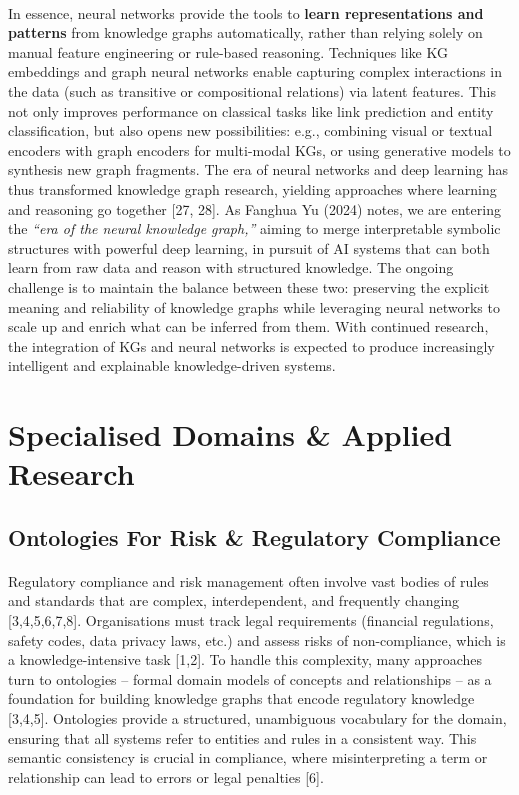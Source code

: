         \paragraph{} In essence, neural networks provide the tools to \textbf{learn representations and patterns} from knowledge graphs automatically, rather than relying solely on manual feature engineering or rule-based reasoning. Techniques like KG embeddings and graph neural networks enable capturing complex interactions in the data (such as transitive or compositional relations) via latent features. This not only improves performance on classical tasks like link prediction and entity classification, but also opens new possibilities: e.g., combining visual or textual encoders with graph encoders for multi-modal KGs, or using generative models to synthesis new graph fragments. The era of neural networks and deep learning has thus transformed knowledge graph research, yielding approaches where learning and reasoning go together [27, 28]. As Fanghua Yu (2024) notes, we are entering the \textit{“era of the neural knowledge graph,”} aiming to merge interpretable symbolic structures with powerful deep learning, in pursuit of AI systems that can both learn from raw data and reason with structured knowledge. The ongoing challenge is to maintain the balance between these two: preserving the explicit meaning and reliability of knowledge graphs while leveraging neural networks to scale up and enrich what can be inferred from them. With continued research, the integration of KGs and neural networks is expected to produce increasingly intelligent and explainable knowledge-driven systems.

\section{Specialised Domains \& Applied Research}

    \subsection{Ontologies For Risk \& Regulatory Compliance}

        \paragraph{} Regulatory compliance and risk management often involve vast bodies of rules and standards that are complex, interdependent, and frequently changing [3,4,5,6,7,8]. Organisations must track legal requirements (financial regulations, safety codes, data privacy laws, etc.) and assess risks of non-compliance, which is a knowledge-intensive task [1,2]. To handle this complexity, many approaches turn to ontologies – formal domain models of concepts and relationships – as a foundation for building knowledge graphs that encode regulatory knowledge [3,4,5]. Ontologies provide a structured, unambiguous vocabulary for the domain, ensuring that all systems refer to entities and rules in a consistent way. This semantic consistency is crucial in compliance, where misinterpreting a term or relationship can lead to errors or legal penalties [6].

